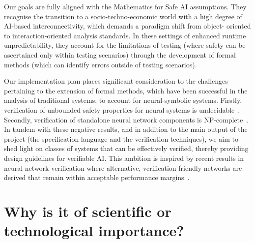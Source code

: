 \documentclass[11pt]{article}
\begin{document}
Our goals are fully aligned with the Mathematics for Safe AI
assumptions.  They recognise the transition to a
socio-techno-economic world with a high degree of AI-based
interconnectivity, which demands a paradigm shift from object-
oriented to interaction-oriented analysis standards. In
these settings of enhanced runtime unpredictability, they
account for the limitations of testing (where safety can be
ascertained only within testing scenarios) through the
development of formal methods (which can identify errors
outside of testing scenarios). 

Our implementation plan  places significant consideration to
the challenges  pertaining to the extension of formal
methods, which have been successful in the analysis of
traditional systems, to account for neural-symbolic systems.
Firstly, verification of unbounded safety properties for
neural systems is undecidable~\cite{Akintunde+20}. Secondly,
verification of standalone neural network components is
NP-complete~\cite{Katz+17}. In tandem with these negative
results, and in addition to the main output of the project
(the specification language and the verification
techniques), we aim to shed light on classes of systems that
can be effectively verified, thereby providing design
guidelines for verifiable AI. This ambition is inspired by
recent results in neural network verification where
alternative, verification-friendly networks are derived
that  remain within acceptable performance
margins~\cite{baninajjarvnn}.


  


\section{Why is it of scientific or technological importance?}
\end{document}
